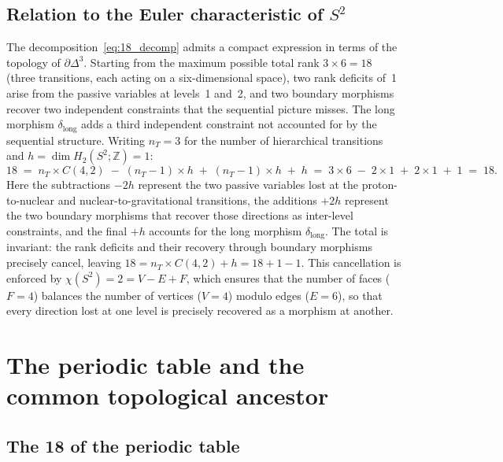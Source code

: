 \documentclass[11pt,a4paper]{article}
\theoremstyle{definition}
\newcommand{\Sfour}{\partial\Delta^3}
\newcommand{\dlong}{\delta_{\mathrm{long}}}
\begin{document}
\subsection{Relation to the Euler characteristic of \texorpdfstring{$S^2$}{S2}}
\label{subsec:euler}

The decomposition~\eqref{eq:18_decomp} admits a compact expression in terms of the topology of $\Sfour$. Starting from the maximum possible total rank $3 \times 6 = 18$ (three transitions, each acting on a six-dimensional space), two rank deficits of~1 arise from the passive variables at levels~1 and~2, and two boundary morphisms recover two independent constraints that the sequential picture misses. The long morphism $\dlong$ adds a third independent constraint not accounted for by the sequential structure. Writing $n_T = 3$ for the number of hierarchical transitions and $h = \dim H_2(S^2;\mathbb{Z}) = 1$:
\begin{equation}
  \label{eq:euler_count}
  18 \;=\; n_T \times C(4,2) \;-\; (n_T - 1) \times h \;+\; (n_T - 1) \times h \;+\; h
  \;=\; 3 \times 6 \;-\; 2 \times 1 \;+\; 2 \times 1 \;+\; 1 \;=\; 18.
\end{equation}
Here the subtractions $-2h$ represent the two passive variables lost at the proton-to-nuclear and nuclear-to-gravitational transitions, the additions $+2h$ represent the two boundary morphisms that recover those directions as inter-level constraints, and the final $+h$ accounts for the long morphism $\dlong$. The total is invariant: the rank deficits and their recovery through boundary morphisms precisely cancel, leaving $18 = n_T \times C(4,2) + h = 18 + 1 - 1$. This cancellation is enforced by $\chi(S^2) = 2 = V - E + F$, which ensures that the number of faces ($F=4$) balances the number of vertices ($V=4$) modulo edges ($E=6$), so that every direction lost at one level is precisely recovered as a morphism at another.

\section{The periodic table and the common topological ancestor}
\label{sec:periodic}

\subsection{The 18 of the periodic table}
\label{subsec:periodic_18}
\end{document}

